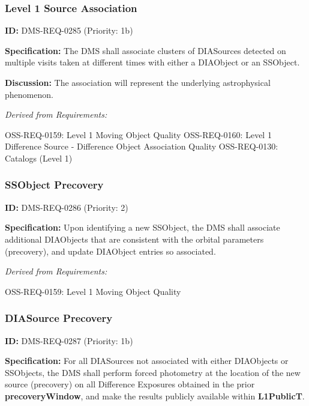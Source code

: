 \documentclass[SE,toc,lsstdraft]{lsstdoc}
\begin{document}
\subsubsection{Level 1 Source Association}

\label{DMS-REQ-0285}
\textbf{ID:} DMS-REQ-0285 (Priority: 1b)

\textbf{Specification:} The DMS shall associate clusters of DIASources detected on multiple visits taken at different times with either a DIAObject or an SSObject.

\textbf{Discussion: }The association will represent the underlying astrophysical phenomenon.

\emph{Derived from Requirements:}

OSS-REQ-0159:
Level 1 Moving Object Quality \newline
OSS-REQ-0160:
Level 1 Difference Source - Difference Object Association Quality \newline
OSS-REQ-0130:
Catalogs (Level 1) \newline

\subsubsection{SSObject Precovery}

\label{DMS-REQ-0286}
\textbf{ID:} DMS-REQ-0286 (Priority: 2)

\textbf{Specification:} Upon identifying a new SSObject, the DMS shall associate additional DIAObjects that are consistent with the orbital parameters (precovery), and update DIAObject entries so associated.

\emph{Derived from Requirements:}

OSS-REQ-0159:
Level 1 Moving Object Quality \newline

\subsubsection{DIASource Precovery}

\label{DMS-REQ-0287}
\textbf{ID:} DMS-REQ-0287 (Priority: 1b)

\textbf{Specification:} For all DIASources not associated with either DIAObjects or SSObjects, the DMS shall perform forced photometry at the location of the new source (precovery) on all Difference Exposures obtained in the prior \textbf{precoveryWindow}, and make the results publicly available within \textbf{L1PublicT}.
\end{document}
